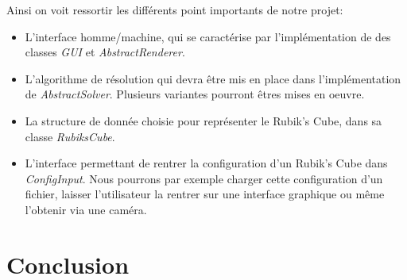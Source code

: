 \documentclass[a4paper]{report}
\begin{document}
\begin{center}
\end{center}
Ainsi on voit ressortir les différents point importants de notre projet: 
\begin{itemize}
    \item L'interface homme/machine, qui se caractérise par l'implémentation de des classes \textit{GUI} et \textit{AbstractRenderer}.
    \item L'algorithme de résolution qui devra être mis en place dans l'implémentation de \textit{AbstractSolver}. Plusieurs variantes pourront êtres mises en oeuvre.
    \item La structure de donnée choisie pour représenter le Rubik's Cube, dans sa classe \textit{RubiksCube}.
    \item L'interface permettant de rentrer la configuration d'un Rubik's Cube dans \textit{ConfigInput}. Nous pourrons par exemple charger cette configuration d'un fichier, laisser l'utilisateur la rentrer sur une interface graphique ou même l'obtenir via une caméra.
\end{itemize}


\chapter*{Conclusion}
\end{document}
